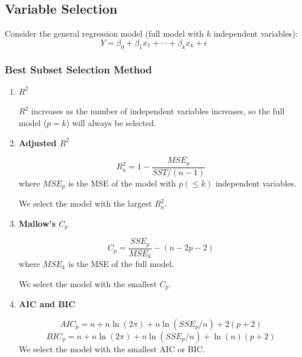 \documentclass[11pt,a4paper]{article}
\begin{document}
\subsection{Variable Selection}
Consider the general regression model (full model with $k$ independent variables):
\[
Y = \beta_0 + \beta_1 x_1 + \cdots + \beta_k x_k + \epsilon
\]

\subsubsection{Best Subset Selection Method}
\begin{enumerate}
    \item \textbf{$R^2$} \par
        $R^2$ increases as the number of independent variables increases, so the full model ($p=k$) will always be selected. \par
    \item \textbf{Adjusted $R^2$} \par
        \[
        R_a^2 = 1 - \frac{MSE_p}{SST/(n-1)}
        \]
        where $MSE_p$ is the MSE of the model with $p(\leqslant k)$ independent variables. \par
        We select the model with the largest $R_a^2$. \par

    \item \textbf{Mallow's $C_p$} \par
        \[
        C_p = \frac{SSE_p}{MSE_k} - (n - 2p - 2)
        \]
        where $MSE_k$ is the MSE of the full model. \par
        We select the model with the smallest $C_p$. \par

    \item \textbf{AIC and BIC} \par
        \[
        AIC_p = n + n \ln(2\pi) + n \ln(SSE_p/n) + 2(p+2)
        \]
        \[
        BIC_p = n + n \ln(2\pi) + n \ln(SSE_p/n) + \ln(n)(p+2)
        \]
        We select the model with the smallest AIC or BIC. \par

\end{enumerate}
\end{document}
